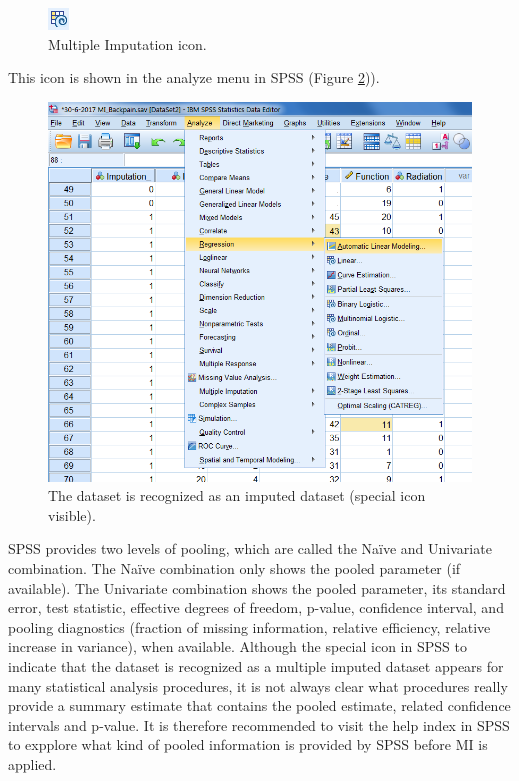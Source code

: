 \documentclass[]{book}
\begin{document}
\begin{figure}

{\centering \includegraphics[width=0.05\linewidth]{images/fig5.3} 

}

\caption{Multiple Imputation icon.}\label{fig:fig5-3}
\end{figure}

This icon is shown in the analyze menu in SPSS (Figure
\ref{fig:fig5-4b})).

\begin{figure}

{\centering \includegraphics[width=0.9\linewidth]{images/fig5.4b} 

}

\caption{The dataset is recognized as an imputed dataset (special icon visible).}\label{fig:fig5-4b}
\end{figure}

SPSS provides two levels of pooling, which are called the Naïve and
Univariate combination. The Naïve combination only shows the pooled
parameter (if available). The Univariate combination shows the pooled
parameter, its standard error, test statistic, effective degrees of
freedom, p-value, confidence interval, and pooling diagnostics (fraction
of missing information, relative efficiency, relative increase in
variance), when available. Although the special icon in SPSS to indicate
that the dataset is recognized as a multiple imputed dataset appears for
many statistical analysis procedures, it is not always clear what
procedures really provide a summary estimate that contains the pooled
estimate, related confidence intervals and p-value. It is therefore
recommended to visit the help index in SPSS to expplore what kind of
pooled information is provided by SPSS before MI is applied.
\end{document}

